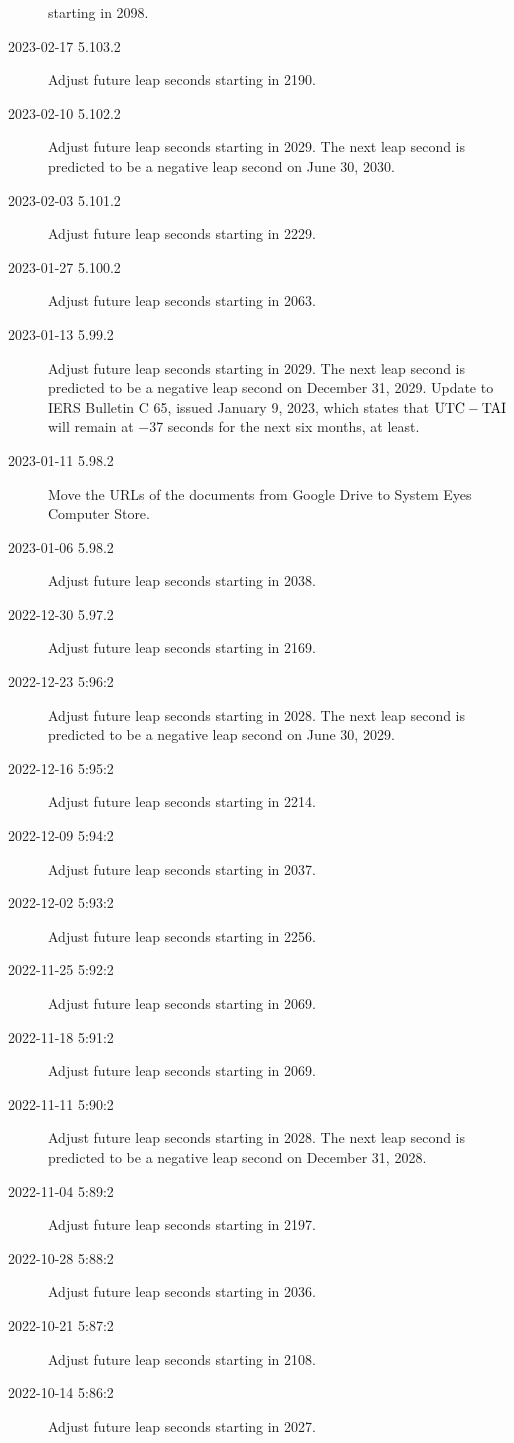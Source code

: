 \documentclass[letterpaper,twoside]{article}
\begin{document}
\begin{description}
  starting in 2098.
\item[2023-02-17 5.103.2]Adjust future leap seconds starting in 2190.
\item[2023-02-10 5.102.2]Adjust future leap seconds starting in 2029.
  The next leap second is predicted to be a negative leap second
  on June 30, 2030.
\item[2023-02-03 5.101.2]Adjust future leap seconds starting in 2229.
\item[2023-01-27 5.100.2]Adjust future leap seconds starting in 2063.
\item[2023-01-13 5.99.2]Adjust future leap seconds starting in 2029.
  The next leap second is predicted to be a negative leap second
  on December 31, 2029.
  Update to IERS Bulletin C 65,
  issued January 9, 2023, which states that $\rm{UTC}-\rm{TAI}$
  will remain at \num{-37} seconds for the next six months, at least.
\item[2023-01-11 5.98.2]Move the URLs of the documents from Google Drive
  to System Eyes Computer Store.
\item[2023-01-06 5.98.2]Adjust future leap seconds starting in 2038.
\item[2022-12-30 5.97.2]Adjust future leap seconds starting in 2169.
\item[2022-12-23 5:96:2]Adjust future leap seconds starting in 2028.
  The next leap second is predicted to be a negative leap second
  on June 30, 2029.
\item[2022-12-16 5:95:2]Adjust future leap seconds starting in 2214.
\item[2022-12-09 5:94:2]Adjust future leap seconds starting in 2037.
\item[2022-12-02 5:93:2]Adjust future leap seconds starting in 2256.
\item[2022-11-25 5:92:2]Adjust future leap seconds starting in 2069.
\item[2022-11-18 5:91:2]Adjust future leap seconds starting in 2069.
\item[2022-11-11 5:90:2]Adjust future leap seconds starting in 2028.
  The next leap second is predicted to be a negative leap second
  on December 31, 2028.
\item[2022-11-04 5:89:2]Adjust future leap seconds starting in 2197.
\item[2022-10-28 5:88:2]Adjust future leap seconds starting in 2036.
\item[2022-10-21 5:87:2]Adjust future leap seconds starting in 2108.
\item[2022-10-14 5:86:2]Adjust future leap seconds starting in 2027.

\end{description}
\end{document}
